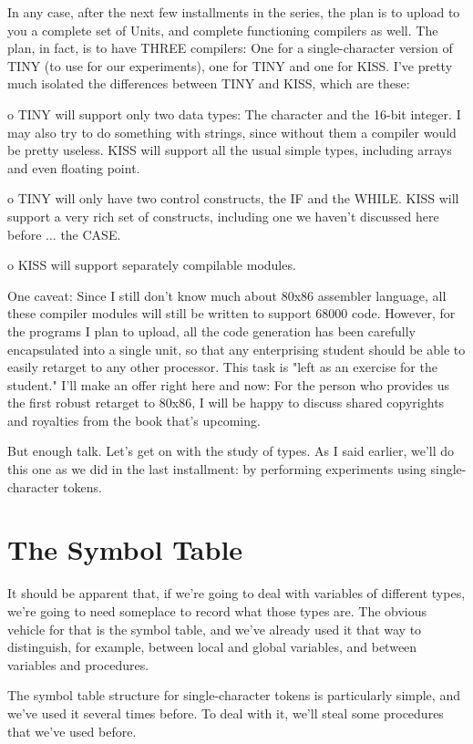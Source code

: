 \documentclass[float=false, crop=false]{standalone}
\begin{document}
In any case, after the next few installments in the series, the plan is to
upload to you a complete set of Units, and complete functioning compilers as
well. The plan, in fact, is to have THREE compilers: One for a single-character
version of TINY (to use for our experiments), one for TINY and one for KISS.
I've pretty much isolated the differences between TINY and KISS, which are
these:

   o TINY will support only two data types: The character and the
     16-bit  integer.    I may also  try  to  do  something  with
     strings, since  without  them  a  compiler  would  be pretty
     useless.   KISS will support all  the  usual  simple  types,
     including arrays and even floating point.

   o TINY will only have two control constructs, the  IF  and the
     WHILE.  KISS will  support  a  very  rich set of constructs,
     including one we haven't discussed here before ... the CASE.

   o KISS will support separately compilable modules.

One caveat: Since I still don't know much about 80x86 assembler language, all
these compiler modules will still be written to support 68000 code. However, for
the programs I plan to upload, all the code generation has been carefully
encapsulated into a single unit, so that any enterprising student should be able
to easily retarget to any other processor. This task is "left as an exercise for
the student." I'll make an offer right here and now: For the person who provides
us the first robust retarget to 80x86, I will be happy to discuss shared
copyrights and royalties from the book that's upcoming.

But enough talk. Let's get on with the study of types. As I said earlier, we'll
do this one as we did in the last installment: by performing experiments using
single-character tokens.


\section{The Symbol Table}

It should be apparent that, if we're going to deal with variables of different
types, we're going to need someplace to record what those types are. The obvious
vehicle for that is the symbol table, and we've already used it that way to
distinguish, for example, between local and global variables, and between
variables and procedures.

The symbol table structure for single-character tokens is particularly simple,
and we've used it several times before. To deal with it, we'll steal some
procedures that we've used before.
\end{document}
